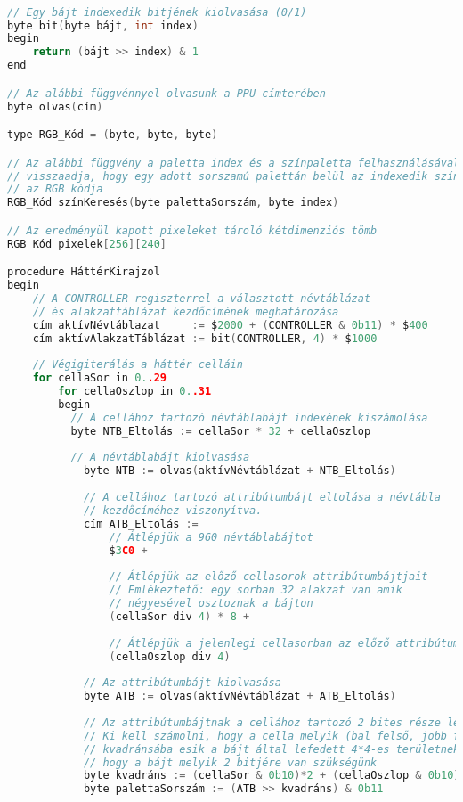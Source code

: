 \begin{lstlisting}[backgroundcolor = \color{white}, language=c, basicstyle=\scriptsize]

// Egy bájt indexedik bitjének kiolvasása (0/1)
byte bit(byte bájt, int index)
begin
	return (bájt >> index) & 1
end

// Az alábbi függvénnyel olvasunk a PPU címterében
byte olvas(cím)

type RGB_Kód = (byte, byte, byte)

// Az alábbi függvény a paletta index és a színpaletta felhasználásával 
// visszaadja, hogy egy adott sorszamú palettán belül az indexedik színnek mi
// az RGB kódja
RGB_Kód színKeresés(byte palettaSorszám, byte index)

// Az eredményül kapott pixeleket tároló kétdimenziós tömb
RGB_Kód pixelek[256][240]

procedure HáttérKirajzol
begin
	// A CONTROLLER regiszterrel a választott névtáblázat
	// és alakzattáblázat kezdőcímének meghatározása
	cím aktívNévtáblazat     := $2000 + (CONTROLLER & 0b11) * $400
	cím aktívAlakzatTáblázat := bit(CONTROLLER, 4) * $1000
	
	// Végigiterálás a háttér celláin
	for cellaSor in 0..29
		for cellaOszlop in 0..31
		begin
		  // A cellához tartozó névtáblabájt indexének kiszámolása
		  byte NTB_Eltolás := cellaSor * 32 + cellaOszlop 
		  
		  // A névtáblabájt kiolvasása
			byte NTB := olvas(aktívNévtáblázat + NTB_Eltolás)
			
			// A cellához tartozó attribútumbájt eltolása a névtábla
			// kezdőcíméhez viszonyítva.
			cím ATB_Eltolás := 
				// Átlépjük a 960 névtáblabájtot 
				$3C0 +		
								
				// Átlépjük az előző cellasorok attribútumbájtjait
				// Emlékeztető: egy sorban 32 alakzat van amik 
				// négyesével osztoznak a bájton
				(cellaSor div 4) * 8 + 	
					
				// Átlépjük a jelenlegi cellasorban az előző attribútumbájtokat
				(cellaOszlop div 4)         
				
			// Az attribútumbájt kiolvasása
			byte ATB := olvas(aktívNévtáblázat + ATB_Eltolás)
			
			// Az attribútumbájtnak a cellához tartozó 2 bites része lesz a palettasorszám.
			// Ki kell számolni, hogy a cella melyik (bal felső, jobb felső, stb.)
			// kvadránsába esik a bájt által lefedett 4*4-es területnek, ugyanis így kapjuk meg,
			// hogy a bájt melyik 2 bitjére van szükségünk
			byte kvadráns := (cellaSor & 0b10)*2 + (cellaOszlop & 0b10) 
			byte palettaSorszám := (ATB >> kvadráns) & 0b11
				

\end{lstlisting}
